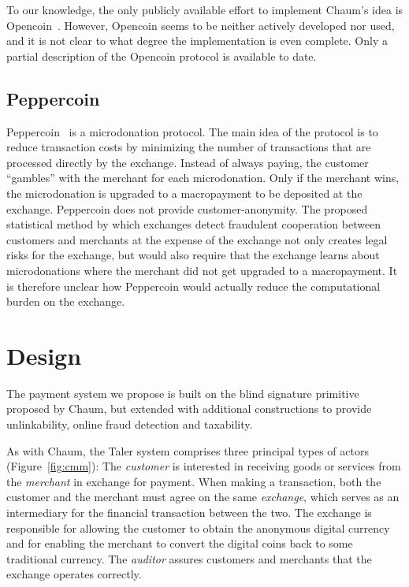\documentclass{llncs}
\begin{document}
To our knowledge, the only publicly available effort to implement
Chaum's idea is Opencoin~\cite{dent2008extensions}.  However, Opencoin
seems to be neither actively developed nor used, and it is not clear
to what degree the implementation is even complete.  Only a partial
description of the Opencoin protocol is available to date.


\subsection{Peppercoin}

Peppercoin~\cite{rivest2004peppercoin} is a microdonation protocol.
The main idea of the protocol is to reduce transaction costs by
minimizing the number of transactions that are processed directly by
the exchange.  Instead of always paying, the customer ``gambles'' with the
merchant for each microdonation.  Only if the merchant wins, the
microdonation is upgraded to a macropayment to be deposited at the
exchange.  Peppercoin does not provide customer-anonymity.  The proposed
statistical method by which exchanges detect fraudulent cooperation between
customers and merchants at the expense of the exchange not only creates
legal risks for the exchange, but would also require that the exchange learns
about microdonations where the merchant did not get upgraded to a
macropayment.  It is therefore unclear how Peppercoin would actually
reduce the computational burden on the exchange.


\section{Design}

The payment system we propose is built on the blind signature
primitive proposed by Chaum, but extended with additional
constructions to provide unlinkability, online fraud detection and
taxability.

As with Chaum, the Taler system comprises three principal types of
actors (Figure~\ref{fig:cmm}): The \emph{customer} is interested in
receiving goods or services from the \emph{merchant} in exchange for
payment.  When making a transaction, both the customer and the
merchant must agree on the same \emph{exchange}, which serves as an
intermediary for the financial transaction between the two.  The exchange
is responsible for allowing the customer to obtain the anonymous
digital currency and for enabling the merchant to convert the
digital coins back to some traditional currency.  The \emph{auditor}
assures customers and merchants that the exchange operates correctly.
\end{document}
